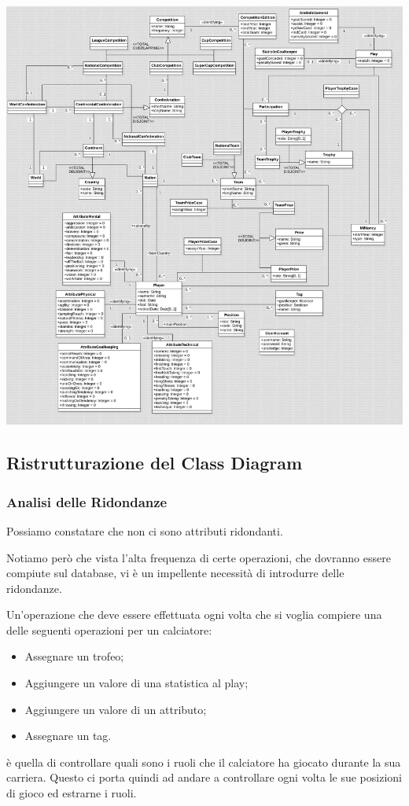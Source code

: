 \includegraphics[width=\textwidth]{res/class_diagram_not_ristr}
\newpage

\subsection{Ristrutturazione del Class Diagram}
\subsubsection{Analisi delle Ridondanze}

Possiamo constatare che non ci sono attributi ridondanti.

Notiamo però che vista l'alta frequenza di certe operazioni, 
che dovranno essere compiute sul database, vi è
un impellente necessità di introdurre delle ridondanze.


Un'operazione che deve essere effettuata ogni volta che
si voglia compiere una delle seguenti operazioni
per un calciatore:
\begin{itemize}
	\item Assegnare un trofeo;
	\item Aggiungere un valore di una statistica
		al play;
	\item Aggiungere un valore di un attributo;
	\item Assegnare un tag.
\end{itemize}
è quella di controllare quali sono i ruoli
che il calciatore ha giocato durante la sua carriera.
Questo ci porta quindi ad andare a controllare ogni volta
le sue posizioni di gioco ed estrarne i ruoli.

